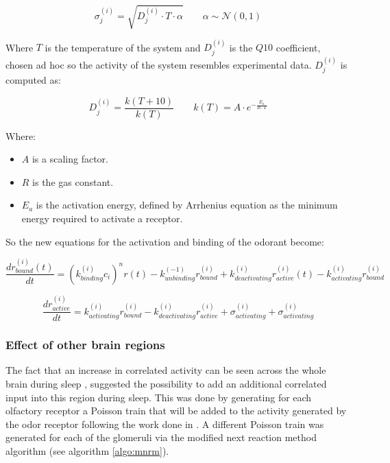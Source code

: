     \begin{equation}
      \sigma_j^{(i)} = \sqrt{D_j^{(i)}\cdot T \cdot \alpha}\qquad \alpha\sim\mathcal{N}(0,1)
    \end{equation}

    Where $T$ is the temperature of the system and $D_j^{(i)}$ is the $Q10$ coefficient, chosen ad hoc so the activity of the system resembles experimental data.
    $D_j^{(i)}$ is computed as:

    \begin{equation}
      D_j^{(i)} = \frac{k(T + 10)}{k(T)}\qquad k(T) = A \cdot e^{-\frac{E_a}{R\cdot T}}
    \end{equation}

    Where:

    \begin{multicols}{2}
      \begin{itemize}
        \item $A$ is a scaling factor.
        \item $R$ is the gas constant.
        \item $E_a$ is the activation energy, defined by Arrhenius equation as the minimum energy required to activate a receptor.
      \end{itemize}
    \end{multicols}

    So the new equations for the activation and binding of the odorant become:

    \begin{equation}
      \frac{dr^{(i)}_{bound}(t)}{dt} = (k_{binding}^{(i)}c_i)^nr(t) - k_{unbinding}^{(-1)}r^{(i)}_{bound} + k_{deactivating}^{(i)}r_{active}^{(i)}(t) - k_{activating}^{(i)}r^{(i)}_{bound}
    \end{equation}

    \begin{equation}
      \frac{dr_{active}^{(i)}}{dt} = k_{activating}^{(i)} r^{(i)}_{bound} - k_{deactivating}^{(i)}r_{active}^{(i)} + \sigma_{activating}^{(i)} + \sigma_{activating}^{(i)}
    \end{equation}

    \subsubsection{Effect of other brain regions}
    \label{sec:poisson-train}
    The fact that an increase in correlated activity can be seen across the whole brain during sleep \cite{slow-wave-synchronization}, suggested the possibility to add an additional correlated input into this region during sleep.
    This was done by generating for each olfactory receptor a Poisson train that will be added to the activity generated by the odor receptor following the work done in \cite{generating-poisson-train}.
    A different Poisson train was generated for each of the glomeruli via the modified next reaction method \cite{modified-next-reaction-method} algorithm (see algorithm \ref{algo:mnrm}).

